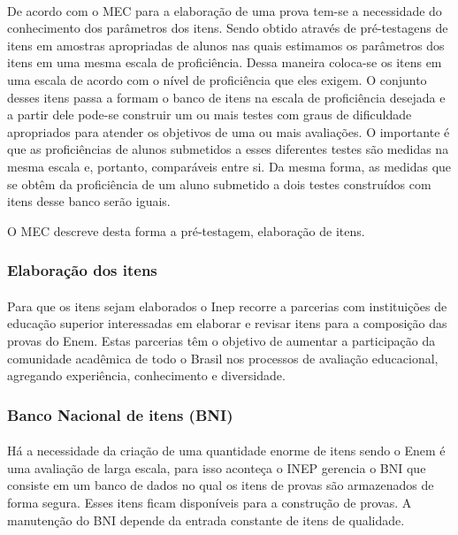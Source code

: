     \paragraph{}
    	De acordo com o MEC para a elaboração  de uma prova  tem-se a necessidade do conhecimento dos parâmetros dos itens. Sendo obtido através de pré-testagens de itens em amostras apropriadas de alunos nas quais estimamos os parâmetros dos itens em uma mesma escala de proficiência. Dessa maneira coloca-se os itens em uma escala de acordo com o nível de proficiência que eles exigem. O conjunto desses itens passa a formam o banco de itens na escala de proficiência desejada e a partir dele pode-se construir um ou mais testes com graus de dificuldade apropriados para atender os objetivos de uma ou mais avaliações. O importante é que as proficiências de alunos submetidos a esses diferentes testes são medidas na mesma escala e, portanto, comparáveis entre si. Da mesma forma, as medidas que se obtêm da proficiência de um aluno submetido a dois testes construídos com itens desse banco serão iguais.
\par
	    O MEC descreve desta forma a pré-testagem, elaboração de itens.
	\subsubsection{Elaboração dos itens}
	\paragraph{}
    	Para que os itens sejam elaborados o Inep recorre a parcerias com instituições de educação superior interessadas em elaborar e revisar itens para a composição das provas do Enem. Estas parcerias têm o objetivo de aumentar a participação da comunidade acadêmica de todo o Brasil nos processos de avaliação educacional, agregando experiência, conhecimento e diversidade.
    \subsubsection{Banco Nacional de itens (BNI)}
    	\paragraph{}
    	Há a necessidade da criação de uma quantidade enorme de itens sendo o Enem é uma avaliação de larga escala, para isso aconteça o INEP gerencia o BNI que consiste em um banco de dados no qual os itens de provas são armazenados de forma segura. Esses itens ficam disponíveis para a construção de provas. A manutenção do BNI depende da entrada constante de itens de qualidade.
